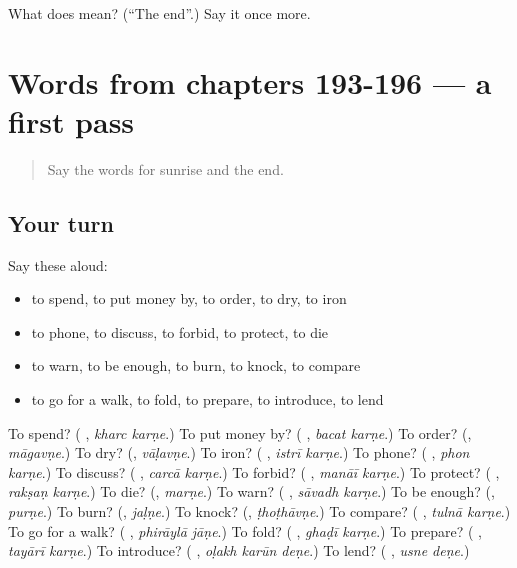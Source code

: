 \begin{tcolorbox}[breakable,colback=teal!4,colframe=teal!35!black,title={Before you move on}]
What does  mean? (\textquotedblleft{}The end\textquotedblright{}.) Say it once more.
\end{tcolorbox}
\section[(dialogue)]{Words from chapters 193-196 — a first pass}

\label{lesson:MR-R201-first-pass-words-from-chapters-193-196}



\begin{quote}
Say the words for sunrise and the end.
\end{quote}

\subsection*{Your turn}
Say these aloud:

\begin{itemize}
\raggedright
  \item to spend, to put money by, to order, to dry, to iron
  \item to phone, to discuss, to forbid, to protect, to die
  \item to warn, to be enough, to burn, to knock, to compare
  \item to go for a walk, to fold, to prepare, to introduce, to lend
\end{itemize}

\begin{tcolorbox}[breakable,colback=teal!4,colframe=teal!35!black,title={Before you move on}]
To spend? (\textbf{ }, \emph{kharc karṇe}.) To put money by? (\textbf{ }, \emph{bacat karṇe}.) To order? (\textbf{}, \emph{māgavṇe}.) To dry? (\textbf{}, \emph{vāḷavṇe}.) To iron? (\textbf{ }, \emph{istrī karṇe}.) To phone? (\textbf{ }, \emph{phon karṇe}.) To discuss? (\textbf{ }, \emph{carcā karṇe}.) To forbid? (\textbf{ }, \emph{manāī karṇe}.) To protect? (\textbf{ }, \emph{rakṣaṇ karṇe}.) To die? (\textbf{}, \emph{marṇe}.) To warn? (\textbf{ }, \emph{sāvadh karṇe}.) To be enough? (\textbf{}, \emph{purṇe}.) To burn? (\textbf{}, \emph{jaḷṇe}.) To knock? (\textbf{}, \emph{ṭhoṭhāvṇe}.) To compare? (\textbf{ }, \emph{tulnā karṇe}.) To go for a walk? (\textbf{ }, \emph{phirāylā jāṇe}.) To fold? (\textbf{ }, \emph{ghaḍī karṇe}.) To prepare? (\textbf{ }, \emph{tayārī karṇe}.) To introduce? (\textbf{  }, \emph{oḷakh karūn deṇe}.) To lend? (\textbf{ }, \emph{usne deṇe}.)
\end{tcolorbox}
